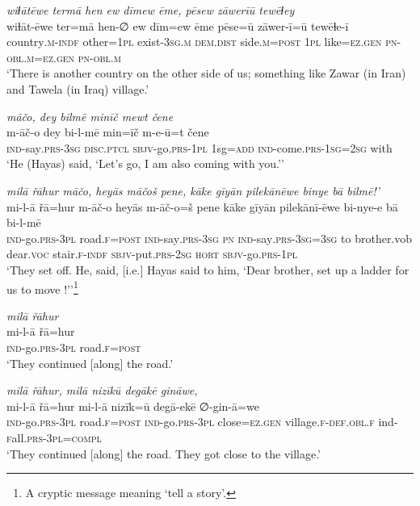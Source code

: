 \ea \label{ŽH.6}
\textit{wiɫātēwe termā hen ew dīmew ēme, pēsew zāwerīū tewēɫey} \\ 
\gll wiɫāt-ēwe ter=mā hen-∅ ew dīm=ew ēme pēse=ū zāwer-ī=ū tewēɫe-ī \\ 
 country\textsc{.m}\textsc{-indf} other\textsc{=1pl} exist\textsc{-3sg}\textsc{.m} \textsc{dem.dist} side\textsc{.m}\textsc{=\textsc{post}} \textsc{1pl} like\textsc{=ez}\textsc{.gen} \textsc{pn}\textsc{-obl}\textsc{.m}\textsc{=ez}\textsc{.gen} \textsc{pn}\textsc{-obl}\textsc{.m} \\ 
\glt `There is another country on the other side of us; something like Zawar (in Iran) and Tawela (in Iraq) village.'
\z 
 
\ea \label{ŽH.11}
\textit{māčo, dey bilmē minīč mewt čene} \\ 
\gll m-āč-o dey bi-l-mē min=īč m-e-ū=t čene \\ 
 \textsc{ind-}say\textsc{.prs}\textsc{-3sg} \textsc{disc.ptcl} \textsc{sbjv-}go\textsc{.prs}\textsc{-1pl} 1sg\textsc{=add} \textsc{ind-}come\textsc{.prs}\textsc{-1sg}\textsc{=\textsc{2sg}} with \\ 
\glt `He (Hayas) said, ‘Let’s go, I am also coming with you.’'
\z 
 
\ea \label{ŽH.12}
\textit{milā řāhur māčo, heyās māčoš pene, kāke gīyān pilekānēwe binye bā bilmē!’} \\ 
\gll mi-l-ā řā=hur m-āč-o heyās m-āč-o=š pene kāke gīyān pilekānī-ēwe bi-nye-e bā bi-l-mē \\ 
 \textsc{ind-}go\textsc{.prs}\textsc{-3pl} road\textsc{\textsc{.f}}\textsc{=\textsc{post}} \textsc{ind-}say\textsc{.prs}\textsc{-3sg} \textsc{pn} \textsc{ind-}say\textsc{.prs}\textsc{-3sg}\textsc{=3sg} to brother.vob dear.\textsc{voc} stair\textsc{\textsc{.f}}\textsc{-indf} \textsc{sbjv-}put\textsc{.prs}-\textsc{2sg} \textsc{hort} \textsc{sbjv-}go\textsc{.prs}\textsc{-1pl} \\ 
\glt `They set off. He, said, [i.e.] Hayas said to him, ‘Dear brother, set up a ladder for us to move !’'\footnote{A cryptic message meaning ‘tell a story’.}
\z 
 
\ea \label{ŽH.14}
\textit{milā řāhur} \\ 
\gll mi-l-ā řā=hur \\ 
 \textsc{ind-}go\textsc{.prs}\textsc{-3pl} road\textsc{\textsc{.f}}\textsc{=\textsc{post}} \\ 
\glt `They continued [along] the road.'
\z 
 
\ea \label{ŽH.15}
\textit{milā řāhur, milā nizīkū degākē gināwe,} \\ 
\gll mi-l-ā řā=hur mi-l-ā nizīk=ū degā-ekē ∅-gin-ā=we \\ 
 \textsc{ind-}go\textsc{.prs}\textsc{-3pl} road\textsc{\textsc{.f}}\textsc{=\textsc{post}} \textsc{ind-}go\textsc{.prs}\textsc{-3pl} close\textsc{=ez}\textsc{.gen} village\textsc{\textsc{.f}}\textsc{-def}\textsc{.obl}\textsc{\textsc{.f}} ind\textsc{-f}all\textsc{.prs}\textsc{-3pl}\textsc{=compl} \\ 
\glt `They continued [along] the road. They got close to the village.'
\z 
 
